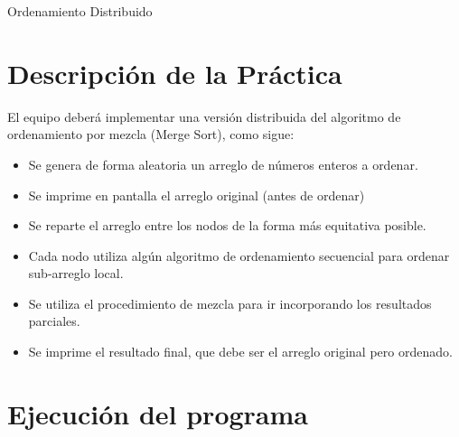 \documentclass[a4paper,12pt]{article}
\begin{document}


\newpage

\begin{center}
    {\huge Ordenamiento Distribuido}
\end{center}


\section*{Descripción de la Práctica}


El equipo deberá implementar una versión distribuida del algoritmo de ordenamiento por
mezcla (Merge Sort), como sigue:
\begin{itemize}
    \item Se genera de forma aleatoria un arreglo de números enteros a ordenar.
    \item Se imprime en pantalla el arreglo original (antes de ordenar)
    \item Se reparte el arreglo entre los nodos de la forma más equitativa posible.
    \item Cada nodo utiliza algún algoritmo de ordenamiento secuencial para ordenar sub-arreglo local.
    \item Se utiliza el procedimiento de mezcla para ir incorporando los resultados parciales.
    \item Se imprime el resultado final, que debe ser el arreglo original pero ordenado.
\end{itemize}



\section*{Ejecución del programa}

\end{document}
